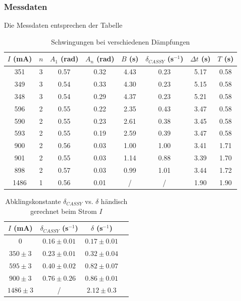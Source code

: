 \documentclass{article}
\begin{document}
\subsubsection{Messdaten}
Die Messdaten entsprechen der Tabelle

\begin{table}[!htb]
    \centering
    \begin{tabular}{|c|c|c|c|c|c|c|c|}
    \hline
    $I$ (mA) & $n$ & $A_1$ (rad) & $A_n$ (rad) & $B$ (s) & $\delta_{CASSY}$ (s$^{-1}$) & $\Delta t$ (s) & $T$ (s) \\
    \hline
    351 & 3 & 0.57 & 0.32 & 4.43 & 0.23 & 5.17 & 0.58 \\
    349 & 3 & 0.54 & 0.33 & 4.30 & 0.23 & 5.15 & 0.58 \\
    348 & 3 & 0.54 & 0.29 & 4.37 & 0.23 & 5.21 & 0.58 \\
    596 & 2 & 0.55 & 0.22 & 2.35 & 0.43 & 3.47 & 0.58 \\
    590 & 2 & 0.55 & 0.23 & 2.61 & 0.38 & 3.45 & 0.58 \\
    593 & 2 & 0.55 & 0.19 & 2.59 & 0.39 & 3.47 & 0.58 \\
    900 & 2 & 0.56 & 0.03 & 1.00 & 1.00 & 3.41 & 1.71 \\
    901 & 2 & 0.55 & 0.03 & 1.14 & 0.88 & 3.39 & 1.70 \\
    898 & 2 & 0.57 & 0.03 & 0.99 & 1.01 & 3.44 & 1.72 \\
    1486 & 1 & 0.56 & 0.01 & / & / & 1.90 & 1.90 \\
    \hline
    \end{tabular}
    \caption{Schwingungen bei verschiedenen Dämpfungen}
    \label{tab:schwingung_dämpfungen}
\end{table}

\begin{table}[!htb]
    \centering
    \begin{tabular}{|c|c|c|c|}
    \hline
    $I$ (mA) & $\delta_{CASSY}$ (s$^{-1}$) & $\delta$ (s$^{-1}$) \\
    \hline
    0 & $0.16 \pm 0.01$ & $0.17 \pm 0.01$ \\
    $350 \pm 3$ & $0.23 \pm 0.01$ & $0.32 \pm 0.04$ \\
    $595 \pm 3$ & $0.40 \pm 0.02$ & $0.82 \pm 0.07$ \\
    $900 \pm 3$ & $0.76 \pm 0.26$ & $0.86 \pm 0.01$ \\
    $1486 \pm 3$ & / & $2.12 \pm 0.3$ \\
    \hline
    \end{tabular}
    \caption{Abklingskonstante $\delta_{CASSY}$ vs. $\delta$ händisch gerechnet beim Strom $I$}
    \label{tab:dämpfungen_strom}
\end{table}
\end{document}
